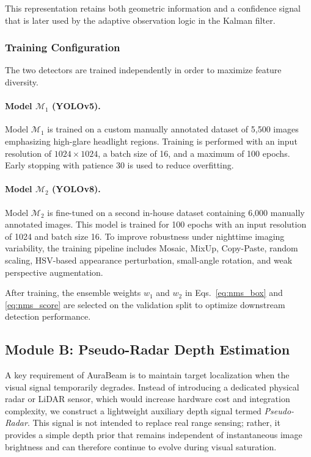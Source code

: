 \documentclass[pdflatex,sn-mathphys-num]{sn-jnl}%
\theoremstyle{thmstyleone}%
\theoremstyle{thmstyletwo}%
\theoremstyle{thmstylethree}%
\begin{document}
This representation retains both geometric information and a confidence signal that is later used by the adaptive observation logic in the Kalman filter.

\subsubsection*{Training Configuration}
\label{subsubsec:training}

The two detectors are trained independently in order to maximize feature diversity.

\paragraph{Model $\mathcal{M}_1$ (YOLOv5).}
Model $\mathcal{M}_1$ is trained on a custom manually annotated dataset of 5{,}500 images emphasizing high-glare headlight regions. Training is performed with an input resolution of $1024\times1024$, a batch size of 16, and a maximum of 100 epochs. Early stopping with patience 30 is used to reduce overfitting.

\paragraph{Model $\mathcal{M}_2$ (YOLOv8).}
Model $\mathcal{M}_2$ is fine-tuned on a second in-house dataset containing 6{,}000 manually annotated images. This model is trained for 100 epochs with an input resolution of 1024 and batch size 16. To improve robustness under nighttime imaging variability, the training pipeline includes Mosaic, MixUp, Copy-Paste, random scaling, HSV-based appearance perturbation, small-angle rotation, and weak perspective augmentation.

After training, the ensemble weights $w_1$ and $w_2$ in Eqs.~\eqref{eq:nms_box} and \eqref{eq:nms_score} are selected on the validation split to optimize downstream detection performance.

\subsection{Module B: Pseudo-Radar Depth Estimation}
\label{subsec:radar}

A key requirement of AuraBeam is to maintain target localization when the visual signal temporarily degrades. Instead of introducing a dedicated physical radar or LiDAR sensor, which would increase hardware cost and integration complexity, we construct a lightweight auxiliary depth signal termed \emph{Pseudo-Radar}. This signal is not intended to replace real range sensing; rather, it provides a simple depth prior that remains independent of instantaneous image brightness and can therefore continue to evolve during visual saturation.
\end{document}
